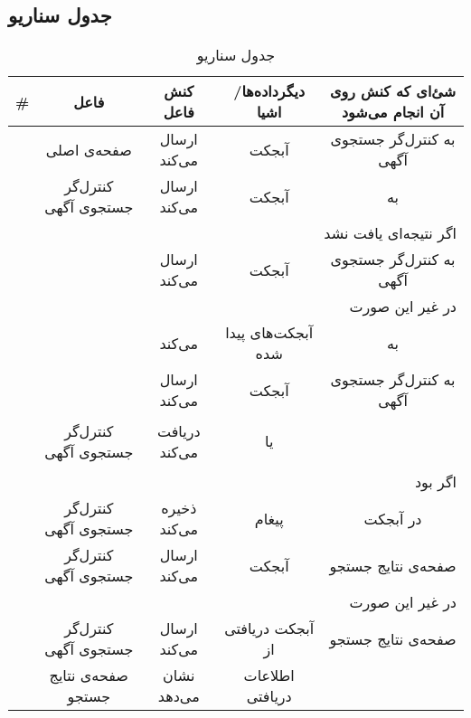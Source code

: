 \subsection{جدول سناریو}
\begin{table}[H]
	\caption{جدول سناریو }
	\begin{adjustbox}{width=\textwidth}
		\begin{tabular}{|c|c|c|c|c|}
			\hline								
			\# & فاعل & کنش فاعل & دیگرداده‌ها/اشیا & شئ‌ای که کنش روی آن انجام می‌شود \\
			\hline
			\hline
			\sstep &
			صفحه‌ی اصلی &
			ارسال می‌کند &
			آبجکت \json &
			به کنترل‌گر جستجوی آگهی \\
			\hline
			\sstep &
			کنترل‌گر جستجوی آگهی&
			ارسال می‌کند &
			آبجکت \json &
			به \gdm\\
			\hline
			\sstep &
			\multicolumn{4}{|r|}{اگر نتیجه‌ای یافت نشد}\\
			\hline
			\sstep &
			\gdm&
			ارسال می‌کند &
			آبجکت \none&
			به کنترل‌گر جستجوی آگهی \\
			\hline
			\sstep &
			\multicolumn{4}{|r|}{در غیر این صورت}\\
			\hline
			\sstep &
			\gdm&
			\serialize می‌کند&
			آبجکت‌های پیدا شده &
			به \json \\
			\hline
			\sstep &
			\gdm &
			ارسال ‌می‌کند&
			آبجکت \json &
			به کنترل‌‌گر جستجوی آگهی \\
			\hline
			\sstep &
			کنترل‌‌گر جستجوی آگهی&
			دریافت می‌کند &
			\begin{inparaitem}
				\item \none 
			\end{inparaitem}
			یا 
			\begin{inparaitem}
				\item \json
			\end{inparaitem}
			&
			\\
			\hline
			\sstep &
			\multicolumn{4}{|r|}{اگر \none بود}
			\\
			\hline
			\sstep &
			کنترل‌گر جستجوی آگهی &
			ذخیره می‌کند &
			پیغام \say{آگهی‌ای پیدا نشد}&
			در آبجکت \json \\
			\hline
			\sstep &
			کنترل‌گر جستجوی آگهی &
			ارسال می‌کند &
			آبجکت \json &
			صفحه‌ی نتایج جستجو\\
			\hline
			\sstep &
			\multicolumn{4}{|r|}{در غیر این صورت}
			\\
			\hline
			\sstep &
			کنترل‌گر جستجوی آگهی&
			ارسال می‌کند &
			آبجکت \json دریافتی از \gdm&
			صفحه‌ی نتایج جستجو\\
			\hline
			\sstep & 
			صفحه‌ی نتایج جستجو &
			نشان می‌دهد & 
			 اطلاعات دریافتی & 
			 \\
			 \hline
		\end{tabular}
	\end{adjustbox}
\end{table}
\setcounter{MainStepCounter}{0}
\setcounter{SenarioCounter}{0}
